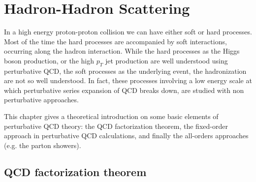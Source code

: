 %
%
%

%


\chapter{Hadron-Hadron Scattering}
\label{chap:Hadron-HadronScattering}

In a high energy proton-proton collision we can have either soft or hard processes.
Most of the time the hard processes are accompanied by soft interactions, occurring along the hadron interaction.
While the hard processes as the Higgs boson production, or the high $p_T$ jet production are well understood using perturbative QCD, the soft processes as the underlying event, the hadronization are not so well understood. In fact, these processes involving a low energy scale at which perturbative series expansion of QCD breaks down, are studied with non perturbative approaches. 

This chapter gives a theoretical introduction on some basic elements of perturbative QCD theory: the QCD factorization theorem, the fixed-order approach in perturbative QCD calculations, and finally the all-orders approaches (e.g. the parton showers).


\section{QCD factorization theorem}

